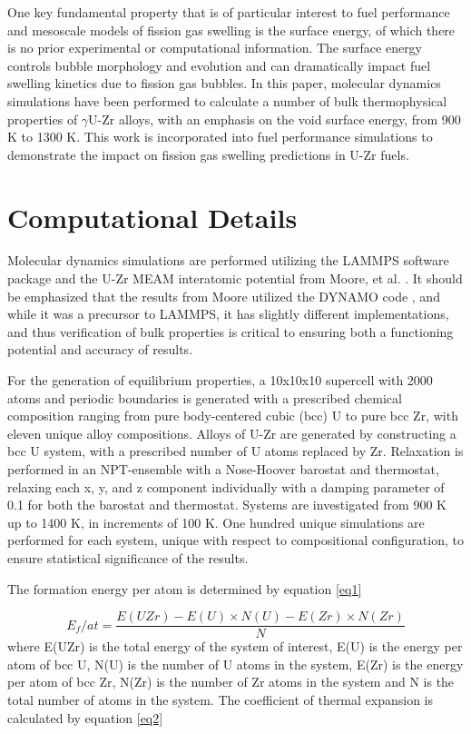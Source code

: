 \documentclass[review]{elsarticle}
\begin{document}
One key fundamental property that is of particular interest to fuel performance and mesoscale models of fission gas swelling is the surface energy, of which there is no prior experimental or computational information. The surface energy controls bubble morphology and evolution and can dramatically impact fuel swelling kinetics due to fission gas bubbles.  In this paper, molecular dynamics simulations have been performed to calculate a number of bulk thermophysical properties of $\gamma$U-Zr alloys, with an emphasis on the void surface energy, from 900 K to 1300 K. This work is incorporated into fuel performance simulations to demonstrate the impact on fission gas swelling predictions in U-Zr fuels.

\section{Computational Details}

Molecular dynamics simulations are performed utilizing the LAMMPS \cite{plimpton1995} software package and the U-Zr MEAM interatomic potential from Moore, et al. \cite{moore2015}. It should be emphasized that the results from Moore \cite{moore2015} utilized the DYNAMO code \cite{dynamo}, and while it was a precursor to LAMMPS, it has slightly different implementations, and thus verification of bulk properties is critical to ensuring both a functioning potential and accuracy of results. 

For the generation of equilibrium properties, a 10x10x10 supercell with 2000 atoms and periodic boundaries is generated with a prescribed chemical composition ranging from pure body-centered cubic (bcc) U to pure bcc Zr, with eleven unique alloy compositions. Alloys of U-Zr are generated by constructing a bcc U system, with a prescribed number of U atoms replaced by Zr. Relaxation is performed in an NPT-ensemble with a Nose-Hoover barostat and thermostat, relaxing each x, y, and z component individually with a damping parameter of 0.1 for both the barostat and thermostat. Systems are investigated from 900 K up to 1400 K, in increments of 100 K. One hundred unique simulations are performed for each system, unique with respect to compositional configuration, to ensure statistical significance of the results.

The formation energy per atom is determined by equation \ref{eq1}

\begin{equation}
\label{eq1}
E_{f}/at= \frac{E(UZr) - E(U)\times N(U) - E(Zr)\times N(Zr)}{N}
\end{equation} where E(UZr) is the total energy of the system of interest, E(U) is the energy per atom of bcc U, N(U) is the number of U atoms in the system, E(Zr) is the energy per atom of bcc Zr, N(Zr) is the number of Zr atoms in the system and N is the total number of atoms in the system. The coefficient of thermal expansion is calculated by equation \ref{eq2}
\end{document}
